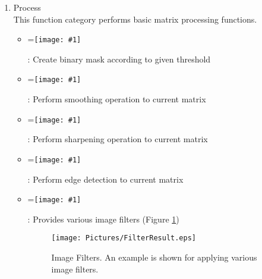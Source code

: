 \documentclass{article}%
\newcommand{\vcenteredinclude}[1]{
\begingroup
\setbox0=\hbox{\texttt{[image: \#1]}}
\parbox{\wd0}{\box0}\endgroup}
\begin{document}
\begin{enumerate}
	\begin{itemize}
		\item \vcenteredinclude{Pictures/FlipLR.eps} : Flip matrix horizontally (along the first dimension)
		\item \vcenteredinclude{Pictures/FlipUD.eps} : Flip matrix vertically (along the second dimension)
		\item \vcenteredinclude{Pictures/FlipZ.eps} : Flip matrix along slice direction (the third dimension)
		\item \vcenteredinclude{Pictures/Rot90L.eps} : Rotate matrix 90 degree in the counter clockwise direction
		\item \vcenteredinclude{Pictures/Rot90R.eps} : Rotate matrix 90 degree in the clockwise direction
		\item \vcenteredinclude{Pictures/Rotate.eps} : Rotate matrix certain degree along an axis specified using the rotation axis origin and direction in the 3D space
		\item \vcenteredinclude{Pictures/Translate.eps} : Translate matrix along certain direction
		\item \vcenteredinclude{Pictures/FFT.eps} : Perform multi-dimensional FFT for current matrix, the user needs to specify up to which dimension to perform FFT.
	\end{itemize}
	
	
	\item Process \\
	
	This function category performs basic matrix processing functions.
	
	\begin{itemize}
		\item \vcenteredinclude{Pictures/Mask.eps} : Create binary mask according to given threshold
		\item \vcenteredinclude{Pictures/Smooth.eps} : Perform smoothing operation to current matrix
		\item \vcenteredinclude{Pictures/Sharpen.eps} : Perform sharpening operation to current matrix
		\item \vcenteredinclude{Pictures/Edge.eps} : Perform edge detection to current matrix
		\item \vcenteredinclude{Pictures/Filter.eps} : Provides various image filters (Figure \ref{fig:FilterResult})
		
		
	\begin{figure}[htbp]
		\centering
			\texttt{[image: Pictures/FilterResult.eps]}
		\caption{Image Filters. An example is shown for applying various image filters.}
		\label{fig:FilterResult}
	\end{figure}
		

\end{itemize}
\end{enumerate}
\end{document}
